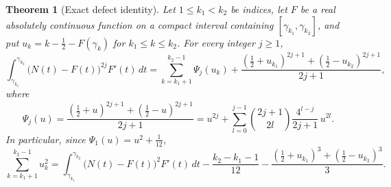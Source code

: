 \documentclass[11pt,a4paper]{article}
\numberwithin{equation}{section}
\newtheorem{theorem}{Theorem}[section]
\theoremstyle{definition}
\theoremstyle{remark}
\begin{document}
\begin{theorem}[Exact defect identity]\label{thm:identity}
Let $1\le k_1<k_2$ be indices, let $F$ be a real absolutely continuous function on a compact interval containing $[\gamma_{k_1},\gamma_{k_2}]$, and put $u_k=k-\frac12-F(\gamma_k)$ for $k_1\le k\le k_2$. For every integer $j\ge1$,
\begin{equation}
\int_{\gamma_{k_1}}^{\gamma_{k_2}}\bigl(N(t)-F(t)\bigr)^{2j}F'(t)\,dt=\sum_{k=k_1+1}^{k_2-1}\Psi_j(u_k)+\frac{(\frac12+u_{k_1})^{2j+1}+(\frac12-u_{k_2})^{2j+1}}{2j+1},
\label{eq:identity_general}
\end{equation}
where
\begin{equation}
\Psi_j(u)=\frac{(\frac12+u)^{2j+1}+(\frac12-u)^{2j+1}}{2j+1}=u^{2j}+\sum_{l=0}^{j-1}\binom{2j+1}{2l}\frac{4^{l-j}}{2j+1}\,u^{2l}.
\label{eq:Psi_def}
\end{equation}
In particular, since $\Psi_1(u)=u^2+\frac1{12}$,
\begin{equation}
\sum_{k=k_1+1}^{k_2-1}u_k^2=\int_{\gamma_{k_1}}^{\gamma_{k_2}}\bigl(N(t)-F(t)\bigr)^2F'(t)\,dt-\frac{k_2-k_1-1}{12}-\frac{(\frac12+u_{k_1})^3+(\frac12-u_{k_2})^3}3 .
\label{eq:identity_quadratic}
\end{equation}
\end{theorem}
\end{document}
